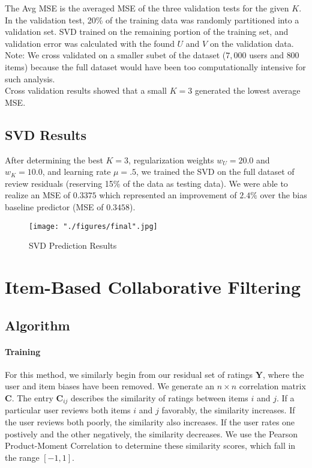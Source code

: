 \documentclass[12pt]{article}
\begin{document}
The Avg MSE is the averaged MSE of the three validation tests for the given $K$. In the validation test, 20\% of the training data was randomly partitioned into a validation set. SVD trained on the remaining portion of the training set, and validation error was calculated with the found $U$ and $V$ on the validation data. Note: We cross validated on a smaller subet of the dataset ($7,000$ users and $800$ items) because the full dataset would have been too computationally intensive for such analysis.\\

 Cross validation results showed that a small $K = 3$ generated the lowest average MSE. \\

\subsection*{SVD Results}

After determining the best $K = 3$, regularization weights $w_U = 20.0$ and $w_K = 10.0$, and learning rate $\mu = .5$, we trained the SVD on the full dataset of review residuals (reserving 15\% of the data as testing data). We were able to realize an MSE of $0.3375$ which represented an improvement of $2.4\%$ over the bias baseline predictor (MSE of $0.3458$).

\begin{figure}[!ht]
\begin{center}
\caption{SVD Prediction Results}
    \texttt{[image: "./figures/final".jpg]}
\end{center}
\end{figure}

\section{Item-Based Collaborative Filtering}

\subsection*{Algorithm}
\paragraph{Training} For this method, we similarly begin from our residual set of ratings $\mathbf{Y}$, where the user and item biases have been removed. We generate an $n \times n$ correlation matrix $\mathbf{C}$. The entry $\mathbf{C}_{ij}$ describes the similarity of ratings between items $i$ and $j$. If a particular user reviews both items $i$ and $j$ favorably, the similarity increases. If the user reviews both poorly, the similarity also increases. If the user rates one postively and the other negatively, the similarity decreases. We use the Pearson Product-Moment Correlation to determine these similarity scores, which fall in the range $[-1, 1]$.
\end{document}
